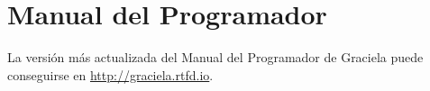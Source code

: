 \chapter{Manual del Programador}
\label{manual}

La versión más actualizada del Manual del Programador de Graciela
puede conseguirse en \url{http://graciela.rtfd.io}. 
